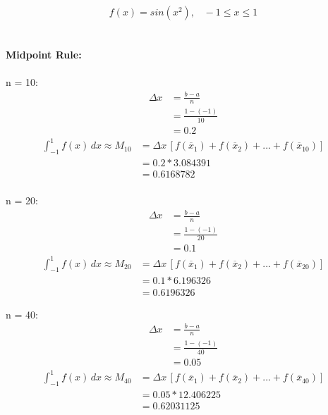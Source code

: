 \documentclass{article}
\begin{document}
    $$ f(x) = sin(x^{2}), \;\;\; -1 \leq x \leq 1 $$ \\\\
    \textbf{Midpoint Rule:}\\\\
    n = 10:\\
    \begin{align*}
        \Delta x &= \frac{b-a}{n}\\
        &= \frac{1-(-1)}{10}\\
        &= 0.2
    \end{align*}
    \begin{align*}
        \int_{-1}^{1} f(x) \, dx \approx M_{10} &= \Delta x \, [f(\overline{x}_1)+f(\overline{x}_2)+...+f(\overline{x}_{10})] \\
        &= 0.2 * 3.084391 \\
        &= 0.6168782 \\
    \end{align*}

    n = 20:\\
    \begin{align*}
        \Delta x &= \frac{b-a}{n} \\
        &= \frac{1-(-1)}{20} \\
        &= 0.1
    \end{align*}
    \begin{align*}
        \int_{-1}^{1} f(x) \, dx \approx M_{20} &= \Delta x \, [f(\overline{x}_1)+f(\overline{x}_2)+...+f(\overline{x}_{20})] \\
        &= 0.1 * 6.196326 \\
        &= 0.6196326
    \end{align*}

    n = 40:\\
    \begin{align*}
        \Delta x &= \frac{b-a}{n}\\
        &= \frac{1-(-1)}{40}\\
        &= 0.05
    \end{align*}
    \begin{align*}
        \int_{-1}^{1} f(x) \, dx \approx M_{40} &= \Delta x \, [f(\overline{x}_1)+f(\overline{x}_2)+...+f(\overline{x}_{40})] \\
        &= 0.05 * 12.406225\\
        &= 0.62031125
    \end{align*} \\\\
\end{document}
